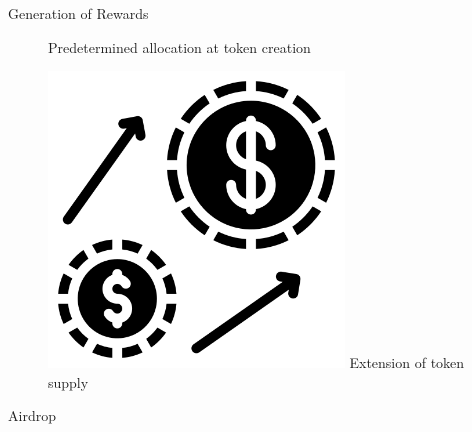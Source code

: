 \documentclass[handout]{beamer}
\begin{document}
\begin{frame}{Generation of Rewards}
\begin{figure}[H]
\begin{minipage}[t]{.25\textwidth}
    Predetermined allocation at token creation
  \end{minipage}
  \hfill
  \begin{minipage}[t]{.25\textwidth}
  \center 
    \includegraphics[width=0.7\textwidth]{../assets/images/inflation.png}
    \vspace{0.8em}\vspace{0.8em}
    Extension of token supply
  \end{minipage}  
\end{figure}




	
\end{frame}


\begin{frame}{Airdrop}
\begin{figure}
\scalebox{0.7}{
	\begin{tikzpicture}
		
	\end{tikzpicture}	
}
\end{figure}

\end{frame}
\end{document}
